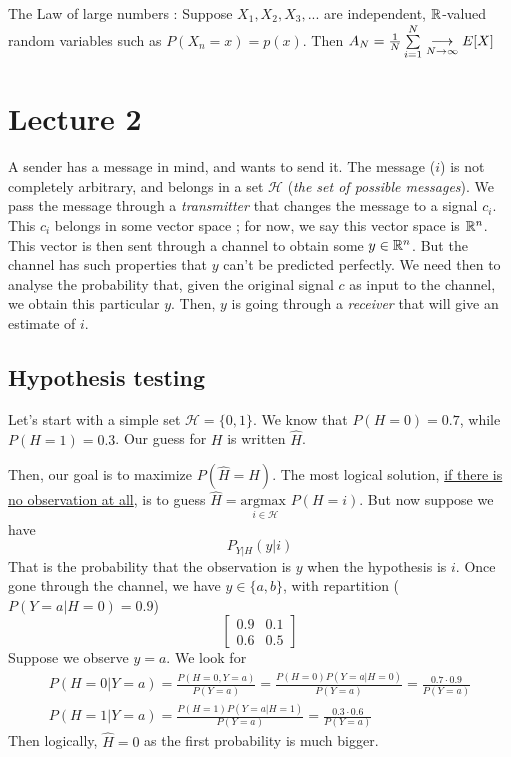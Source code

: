\documentclass[11pt,a4paper]{article}
\begin{document}
The Law of large numbers : Suppose $X_1,X_2,X_3,...$ are independent, $\R$-valued random variables such as $P(X_n = x) = p(x)$. Then $A_N = \frac{1}{N}\somme{N}{i=1} \underset{N\to\infty}{\longrightarrow} E[X]$

\section{Lecture 2}
A sender has a message in mind, and wants to send it. The message ($i$) is not completely arbitrary, and belongs in a set $\mathcal{H}$ (\textit{the set of possible messages}). We pass the message through a \textit{transmitter} that changes the message to a signal $c_i$. This $c_i$ belongs in some vector space ; for now, we say this vector space is $\rn$. This vector is then sent through a channel to obtain some $y \in \rn$. But the channel has such properties that $y$ can't be predicted perfectly. We need then to analyse the probability that, given the original signal $c$ as input to the channel, we obtain this particular $y$. Then, $y$ is going through a \textit{receiver} that will give an estimate of $i$.

\subsection{Hypothesis testing}
Let's start with a simple set $\mathcal{H} = \{0,1\}$. We know that $P(H=0) = 0.7$, while $P(H=1) = 0.3$. Our guess for $H$ is written $\hat{H}$. 

Then, our goal is to maximize $P(\hat{H} = H)$. The most logical solution, \uline{if there is no observation at all}, is to guess $\hat{H} = \underset{i \in \mathcal{H}}{\text{argmax }}P(H=i)$. But now suppose we have 
\[P_{Y|H}(y|i)\]
That is the probability that the observation is $y$ when the hypothesis is $i$. Once gone through the channel, we have $y \in \{a,b\}$, with repartition ($P(Y=a | H=0) = 0.9$)
\[\begin{bmatrix}
    0.9 & 0.1\\
    0.6 & 0.5
\end{bmatrix}\] Suppose we observe $y=a$. We look for
\begin{align*}
    P(H=0 | Y=a) = \frac{P(H=0,Y=a)}{P(Y=a)} = \frac{P(H=0)P(Y=a|H=0)}{P(Y=a)} = \frac{0.7 \cdot 0.9}{P(Y=a)}\\
    P(H=1|Y=a) = \frac{P(H=1)P(Y=a|H=1)}{P(Y=a)} = \frac{0.3\cdot0.6}{P(Y=a)}
\end{align*}
Then logically, $\hat{H} = 0$ as the first probability is much bigger.
\end{document}
